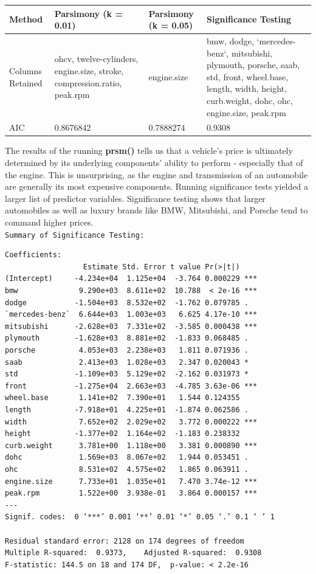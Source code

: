 \documentclass[letter]{article}
\begin{document}
\begin{center}
    \begin{tabular}{ | l |  p{4cm} |  p{4cm} | p{4cm} |}
    \hline
    Method & Parsimony (k = 0.01) & Parsimony (k = 0.05) & Significance Testing \\ \hline
    
    Columns Retained & ohcv, twelve-cylinders, engine.size, stroke, compression.ratio, peak.rpm & engine.size & bmw, dodge, `mercedes-benz`, mitsubishi, plymouth, porsche, saab, std, front, wheel.base, length, width, height, curb.weight, dohc, ohc, engine.size, peak.rpm\\ \hline
    
    AIC & 0.8676842 & 0.7888274 & 0.9308\\ \hline
    
    \end{tabular}
\end{center}
  The results of the running \textbf{prsm()} tells us that a vehicle's price is ultimately determined by its underlying components' ability to perform - especially that of the engine.  This is unsurprising, as the engine and transmission of an automobile are generally its most expensive components.  Running significance tests yielded a larger list of predictor variables. Significance testing shows that larger automobiles as well as luxury brands like BMW, Mitsubishi, and Porsche tend to command higher prices.\\
\texttt{Summary of Significance Testing:}\\
\begin{verbatim}
Coefficients:
                  Estimate Std. Error t value Pr(>|t|)    
(Intercept)     -4.234e+04  1.125e+04  -3.764 0.000229 ***
bmw              9.290e+03  8.611e+02  10.788  < 2e-16 ***
dodge           -1.504e+03  8.532e+02  -1.762 0.079785 .  
`mercedes-benz`  6.644e+03  1.003e+03   6.625 4.17e-10 ***
mitsubishi      -2.628e+03  7.331e+02  -3.585 0.000438 ***
plymouth        -1.628e+03  8.881e+02  -1.833 0.068485 .  
porsche          4.053e+03  2.238e+03   1.811 0.071936 .  
saab             2.413e+03  1.028e+03   2.347 0.020043 *  
std             -1.109e+03  5.129e+02  -2.162 0.031973 *  
front           -1.275e+04  2.663e+03  -4.785 3.63e-06 ***
wheel.base       1.141e+02  7.390e+01   1.544 0.124355    
length          -7.918e+01  4.225e+01  -1.874 0.062586 .  
width            7.652e+02  2.029e+02   3.772 0.000222 ***
height          -1.377e+02  1.164e+02  -1.183 0.238332    
curb.weight      3.781e+00  1.118e+00   3.381 0.000890 ***
dohc             1.569e+03  8.067e+02   1.944 0.053451 .  
ohc              8.531e+02  4.575e+02   1.865 0.063911 .  
engine.size      7.733e+01  1.035e+01   7.470 3.74e-12 ***
peak.rpm         1.522e+00  3.938e-01   3.864 0.000157 ***
---
Signif. codes:  0 ‘***’ 0.001 ‘**’ 0.01 ‘*’ 0.05 ‘.’ 0.1 ‘ ’ 1

Residual standard error: 2128 on 174 degrees of freedom
Multiple R-squared:  0.9373,	Adjusted R-squared:  0.9308 
F-statistic: 144.5 on 18 and 174 DF,  p-value: < 2.2e-16  
\end{verbatim}
\end{document}
